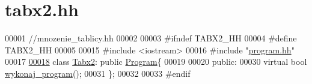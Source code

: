 \hypertarget{tabx2_8hh}{\section{tabx2.\-hh}
\label{tabx2_8hh}
}

\begin{DoxyCode}
00001 \textcolor{comment}{//mnozenie\_tablicy.hh}
00002 
00003 \textcolor{preprocessor}{#ifndef TABX2\_HH}
00004 \textcolor{preprocessor}{}\textcolor{preprocessor}{#define TABX2\_HH}
00005 \textcolor{preprocessor}{}
00015 \textcolor{preprocessor}{#include <iostream>}
00016 \textcolor{preprocessor}{#include "\hyperlink{program_8hh}{program.hh}"}
00017 
\hypertarget{tabx2_8hh_source_l00018}{}\hyperlink{class_tabx2}{00018} \textcolor{keyword}{class }\hyperlink{class_tabx2}{Tabx2}: \textcolor{keyword}{public} \hyperlink{class_program}{Program}\{
00019 
00020 \textcolor{keyword}{public}:
00030   \textcolor{keyword}{virtual} \textcolor{keywordtype}{bool} \hyperlink{class_tabx2_a30db6636cba36a354443ec5f101fd188}{wykonaj\_program}();
00031 \};
00032 
00033 \textcolor{preprocessor}{#endif}
\end{DoxyCode}
